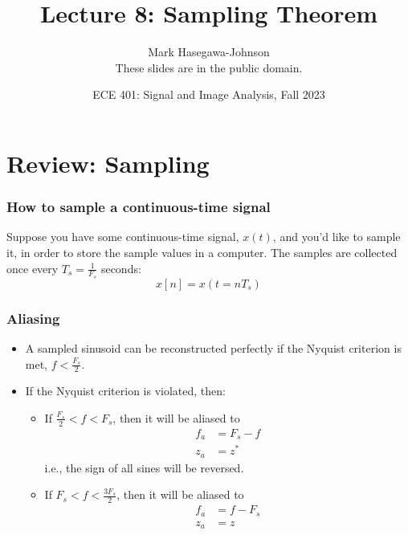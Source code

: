 \documentclass{beamer}
\title{Lecture 8: Sampling Theorem}
\author{Mark Hasegawa-Johnson\\These slides are in the public domain.}
\date{ECE 401: Signal and Image Analysis, Fall 2023}
\begin{document}
\begin{frame}
  \maketitle
\end{frame}

\begin{frame}
  \tableofcontents
\end{frame}

\section[Sampling]{Review: Sampling}
\setcounter{subsection}{1}

\begin{frame}
  \frametitle{How to sample a continuous-time signal}

  Suppose you have some continuous-time signal, $x(t)$, and you'd like
  to sample it, in order to store the sample values in a computer.
  The samples are collected once every $T_s=\frac{1}{F_s}$ seconds:
  \begin{displaymath}
    x[n] = x(t=nT_s)
  \end{displaymath}
\end{frame}

\begin{frame}
  \frametitle{Aliasing}

  \begin{itemize}
  \item A sampled sinusoid can be reconstructed perfectly if the
    Nyquist criterion is met, $f < \frac{F_s}{2}$.
  \item If the Nyquist criterion is violated, then:
    \begin{itemize}
    \item If $\frac{F_s}{2}<f<F_s$, then it will be aliased to
      \begin{align*}
        f_a &= F_s-f\\
        z_a &= z^*
      \end{align*}
      i.e., the sign of all sines will be reversed.
    \item If $F_s < f < \frac{3F_s}{2}$, then it will be aliased to
      \begin{align*}
        f_a &= f-F_s\\
        z_a &= z
      \end{align*}
    \end{itemize}
  \end{itemize}
\end{frame}
\end{document}
